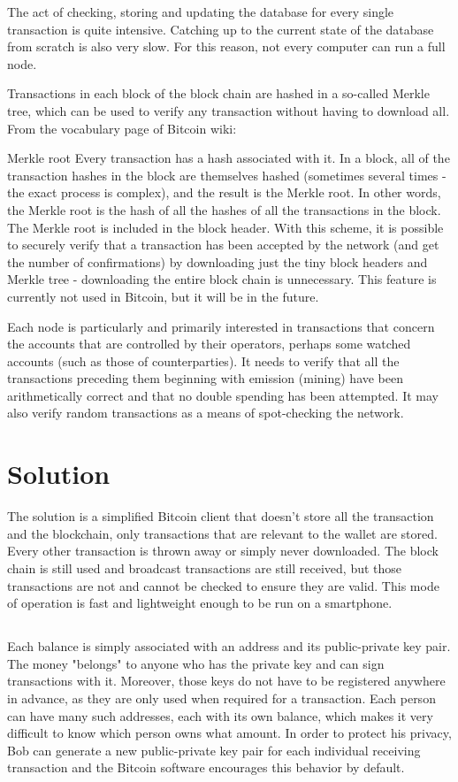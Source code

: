 \documentclass[a4paper,12pt]{article}
\begin{document}
The act of checking, storing and updating the database for every single transaction is quite intensive. Catching up to the current state of the database from scratch is also very slow. For this reason, not every computer can run a full node.

Transactions in each block of the block chain are hashed in a so-called Merkle tree,
which can be used to verify any transaction without having to download all. From the
vocabulary page of Bitcoin wiki:

Merkle root Every transaction has a hash associated with it. In a block,
all of the transaction hashes in the block are themselves hashed (sometimes
several times - the exact process is complex), and the result is the Merkle
root. In other words, the Merkle root is the hash of all the hashes of all the
transactions in the block. The Merkle root is included in the block header.
With this scheme, it is possible to securely verify that a transaction has
been accepted by the network (and get the number of confirmations) by
downloading just the tiny block headers and Merkle tree - downloading the
entire block chain is unnecessary. This feature is currently not used in Bitcoin,
but it will be in the future.

Each node is particularly and primarily interested in transactions that concern the
accounts that are controlled by their operators, perhaps some watched accounts (such
as those of counterparties). It needs to verify that all the transactions preceding them
beginning with emission (mining) have been arithmetically correct and that no double
spending has been attempted. It may also verify random transactions as a means of
spot-checking the network.

\section{Solution}
The solution is a simplified Bitcoin client that doesn't store all the transaction and the blockchain, only transactions that are relevant to the wallet are stored. Every other transaction is thrown away or simply never downloaded. The block chain is still used and broadcast transactions are still received, but those transactions are not and cannot be checked to ensure they are valid. This mode of operation is fast and lightweight enough to be run on a smartphone.


\subsection{}
Each balance is simply associated with an address and its public-private key pair. The money "belongs" to anyone who has the private key and can sign transactions with it. Moreover, those keys do not have to be registered anywhere in advance, as they are only used when required for a transaction. Each person can have many such addresses, each with its own balance, which makes it very difficult to know which person owns what amount. In order to protect his privacy, Bob can generate a new public-private key pair for each individual receiving transaction and the Bitcoin software encourages this behavior by default.
\end{document}
